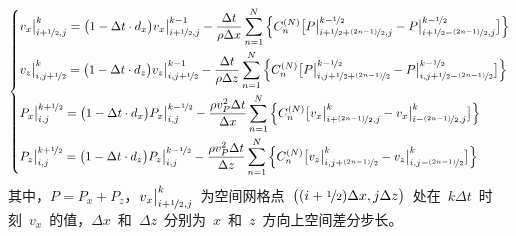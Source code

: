 \documentclass[UTF8]{ctexart}
\begin{document}
\begin{equation}
\left\{ \begin{aligned}
& v_x\big|_{i+\nicefrac{1}{2},j}^k=\big(1-\Delta t\cdot d_x\big) v_x\big|_{i+\nicefrac{1}{2},j}^{k-1}-\frac{\Delta t}{\rho\Delta x}\sum\limits_{n=1}^N\Big\{C_n^{(N)}\big[P\big|_{i+\nicefrac{1}{2}+\nicefrac{(2n-1)}{2},j}^{k-\nicefrac{1}{2}}-P\big|_{i+\nicefrac{1}{2}-\nicefrac{(2n-1)}{2},j}^{k-\nicefrac{1}{2}}\big]\Big\} \\
& v_z\big|_{i,j+\nicefrac{1}{2}}^k=\big(1-\Delta t\cdot d_z\big) v_z\big|_{i,j+\nicefrac{1}{2}}^{k-1}-\frac{\Delta t}{\rho\Delta z}\sum\limits_{n=1}^N\Big\{C_n^{(N)}\big[P\big|_{i,j+\nicefrac{1}{2}+\nicefrac{(2n-1)}{2}}^{k-\nicefrac{1}{2}}-P\big|_{i,j+\nicefrac{1}{2}-\nicefrac{(2n-1)}{2}}^{k-\nicefrac{1}{2}}\big]\Big\} \\
& P_x\big|_{i,j}^{k+\nicefrac{1}{2}}=\big(1-\Delta t\cdot d_x\big) P_x\big|_{i,j}^{k-\nicefrac{1}{2}}-\frac{\rho v_P^2\Delta t}{\Delta x}\sum\limits_{n=1}^N\Big\{C_n^{(N)}\big[v_x\big|_{i+\nicefrac{(2n-1)}{2},j}^k-v_x\big|_{i-\nicefrac{(2n-1)}{2},j}^k\big]\Big\} \\
& P_z\big|_{i,j}^{k+\nicefrac{1}{2}}=\big(1-\Delta t\cdot d_z\big) P_z\big|_{i,j}^{k-\nicefrac{1}{2}}-\frac{\rho v_P^2\Delta t}{\Delta z}\sum\limits_{n=1}^N\Big\{C_n^{(N)}\big[v_z\big|_{i,j+\nicefrac{(2n-1)}{2}}^k-v_z\big|_{i,j-\nicefrac{(2n-1)}{2}}^k\big]\Big\}
\end{aligned} \right.
\end{equation}
其中，$P=P_x+P_z$，$v_x\big|_{i+\nicefrac{1}{2},j}^k$~为空间网格点~$\big((i+\nicefrac{1}{2})\Delta x,j\Delta z\big)$~处在~$k\Delta t$~时刻~$v_x$~的值，$\Delta x$~和~$\Delta z$~分别为~$x$~和~$z$~方向上空间差分步长。\par
\end{document}
